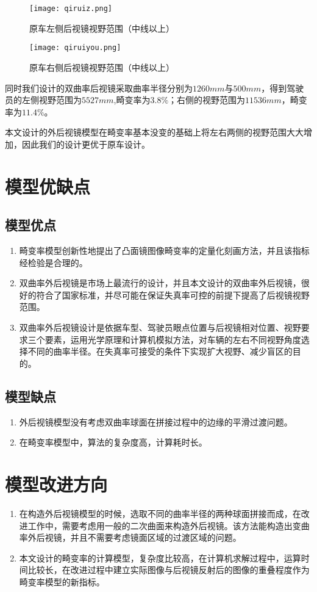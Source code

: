 \documentclass[bwprint]{cumcmthesis}
\begin{document}
\begin{figure}[!htpb]
\small
\centering
\texttt{[image: qiruiz.png]}
\caption{原车左侧后视镜视野范围（中线以上）} \label{fig:qiruiz}
\end{figure}

\begin{figure}[!htpb]
\small
\centering
\texttt{[image: qiruiyou.png]}
\caption{原车右侧后视镜视野范围（中线以上）} \label{fig:qiruiy}
\end{figure}

\par 同时我们设计的双曲率后视镜采取曲率半径分别为$1260mm$与$500mm$，得到驾驶员的左侧视野范围为$5527mm$,畸变率为$3.8\%$；右侧的视野范围为$11536 mm$，畸变率为$11.4\%$。

\par 本文设计的外后视镜模型在畸变率基本没变的基础上将左右两侧的视野范围大大增加，因此我们的设计更优于原车设计。


\section{模型优缺点}
\subsection{模型优点}
\begin{enumerate}
	\item 畸变率模型创新性地提出了凸面镜图像畸变率的定量化刻画方法，并且该指标经检验是合理的。
	\item 双曲率外后视镜是市场上最流行的设计，并且本文设计的双曲率外后视镜，很好的符合了国家标准，并尽可能在保证失真率可控的前提下提高了后视镜视野范围。
	\item 双曲率外后视镜设计是依据车型、驾驶员眼点位置与后视镜相对位置、视野要求三个要素，运用光学原理和计算机模拟方法，对车辆的左右不同视野角度选择不同的曲率半径。在失真率可接受的条件下实现扩大视野、减少盲区的目的。
\end{enumerate}
\subsection{模型缺点}
\begin{enumerate}
	\item 外后视镜模型没有考虑双曲率球面在拼接过程中的边缘的平滑过渡问题。
	\item 在畸变率模型中，算法的复杂度高，计算耗时长。
\end{enumerate}
\section{模型改进方向}
\begin{enumerate}
	\item 在构造外后视镜模型的时候，选取不同的曲率半径的两种球面拼接而成，在改进工作中，需要考虑用一般的二次曲面来构造外后视镜。该方法能构造出变曲率外后视镜，并且不需要考虑镜面区域的过渡区域的问题。
	\item 本文设计的畸变率的计算模型，复杂度比较高，在计算机求解过程中，运算时间比较长，在改进过程中建立实际图像与后视镜反射后的图像的重叠程度作为畸变率模型的新指标。
\end{enumerate}
\end{document}
